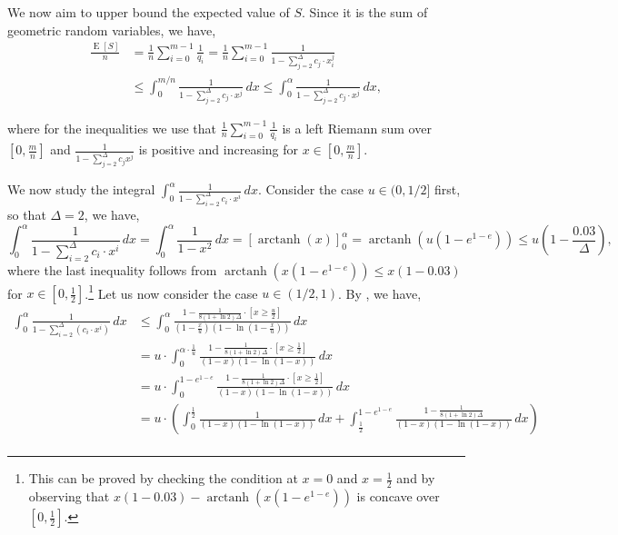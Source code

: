 \documentclass[11pt]{article}
\DeclareMathOperator*{\E}{E}
\DeclareMathOperator{\arctanh}{arctanh}
\begin{document}
\begin{appendixproof}
We now aim to upper bound the expected value of $S$. Since it is the sum of geometric random variables, we have,
\begin{align*}
\frac{\E[S]}{n} & = \frac{1}{n} \sum_{i=0}^{m-1} \frac{1}{q_i}= \frac{1}{n}\sum_{i=0}^{m-1}\frac{1}{1-\sum_{j=2}^\Delta c_j \cdot x_i^j}\\
& \leq \int_0^{m/n}\frac{1}{1-\sum_{j=2}^\Delta c_j \cdot x^j} \, dx  \leq \int_0^{\alpha}\frac{1}{1-\sum_{j=2}^\Delta c_j \cdot x^j} \, dx,
\end{align*}

where for the inequalities we use that $\frac{1}{n}\sum_{i=0}^{m-1}\frac{1}{q_i}$ is a left Riemann sum over $[0,\frac{m}{n}]$ and $\frac{1}{1-\sum_{j=2}^\Delta c_j x^j}$ is positive and increasing for $x\in[0,\frac{m}{n}]$. 

We now study the integral $\int_0^{\alpha}\frac{1}{1-\sum_{i=2}^\Delta c_i \cdot x^i} \, dx$. Consider the case $u\in(0,1/2]$ first, so that $\Delta=2$, we have,
\[
\int_0^{\alpha}\frac{1}{1-\sum_{i=2}^\Delta c_i \cdot x^i} \, dx = \int_0^{\alpha} \frac{1}{1-x^2} \, dx = [\arctanh(x)]_0^{\alpha} = \arctanh\left(u(1-e^{1-e})\right) \leq u\left(1-\frac{0.03}{\Delta}\right),
\]
where the last inequality follows from $\arctanh(x(1-e^{1-e})) \leq x(1 - 0.03)$ for $x\in[0,\frac12]$.\footnote{This can be proved by checking the condition at $x=0$ and $x=\frac12$ and by observing that $x(1 - 0.03)-\arctanh(x(1-e^{1-e}))$ is concave over $[0,\frac12]$.} Let us now consider the case $u\in(1/2, 1)$. By , we have, 
\begin{align*}
\int_0^{\alpha} \frac1{1- \sum_{i=2}^\Delta \left(c_i \cdot x^i\right)} \, dx 
& \le 
    \int_0^{\alpha} \frac{1-\frac{1}{8(1+\ln 2)\Delta} \cdot \left[ x \ge \frac{u}{2}\right]}{\left(1-\frac xu\right)\left(1-\ln\left(1-\frac xu\right)\right)} \, dx\\
& = u\cdot 
    \int_0^{\alpha \cdot \frac 1u} \frac{1-\frac{1}{8(1+\ln 2)\Delta} \cdot \left[ x \ge \frac12\right]}{\left(1- x\right)\left(1-\ln\left(1-x\right)\right)} \, dx\\
& = u\cdot 
    \int_0^{1-e^{1-e}} \frac{1-\frac{1}{8(1+\ln 2)\Delta} \cdot \left[ x \ge \frac12\right]}{\left(1- x\right)\left(1-\ln\left(1-x\right)\right)} \, dx\\
& = u\cdot \left(\int_0^{\frac12} \frac{1}{\left(1- x\right)\left(1-\ln\left(1-x\right)\right)} \, dx + \int_{\frac12}^{1-e^{1-e}} \frac{1-\frac{1}{8(1+\ln 2)\Delta}}{\left(1- x\right)\left(1-\ln\left(1-x\right)\right)} \, dx\right)\\

\end{align*}
\end{appendixproof}
\end{document}
